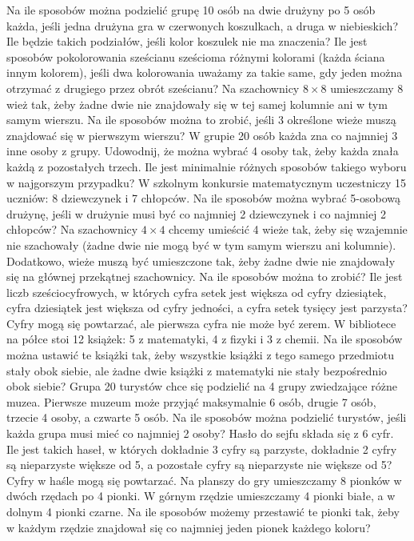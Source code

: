 Na ile sposobów można podzielić grupę 10 osób na dwie drużyny po 5 osób każda, jeśli jedna drużyna gra w czerwonych koszulkach, a druga w niebieskich? Ile będzie takich podziałów, jeśli kolor koszulek nie ma znaczenia?
Ile jest sposobów pokolorowania sześcianu sześcioma różnymi kolorami (każda ściana innym kolorem), jeśli dwa kolorowania uważamy za takie same, gdy jeden można otrzymać z drugiego przez obrót sześcianu?
Na szachownicy $8 \times 8$ umieszczamy 8 wież tak, żeby żadne dwie nie znajdowały się w tej samej kolumnie ani w tym samym wierszu. Na ile sposobów można to zrobić, jeśli 3 określone wieże muszą znajdować się w pierwszym wierszu?
W grupie 20 osób każda zna co najmniej 3 inne osoby z grupy. Udowodnij, że można wybrać 4 osoby tak, żeby każda znała każdą z pozostałych trzech. Ile jest minimalnie różnych sposobów takiego wyboru w najgorszym przypadku?
W szkolnym konkursie matematycznym uczestniczy 15 uczniów: 8 dziewczynek i 7 chłopców. Na ile sposobów można wybrać 5-osobową drużynę, jeśli w drużynie musi być co najmniej 2 dziewczynek i co najmniej 2 chłopców?
Na szachownicy $4 \times 4$ chcemy umieścić 4 wieże tak, żeby się wzajemnie nie szachowały (żadne dwie nie mogą być w tym samym wierszu ani kolumnie). Dodatkowo, wieże muszą być umieszczone tak, żeby żadne dwie nie znajdowały się na głównej przekątnej szachownicy. Na ile sposobów można to zrobić?
Ile jest liczb sześciocyfrowych, w których cyfra setek jest większa od cyfry dziesiątek, cyfra dziesiątek jest większa od cyfry jedności, a cyfra setek tysięcy jest parzysta? Cyfry mogą się powtarzać, ale pierwsza cyfra nie może być zerem.
W bibliotece na półce stoi 12 książek: 5 z matematyki, 4 z fizyki i 3 z chemii. Na ile sposobów można ustawić te książki tak, żeby wszystkie książki z tego samego przedmiotu stały obok siebie, ale żadne dwie książki z matematyki nie stały bezpośrednio obok siebie?
Grupa 20 turystów chce się podzielić na 4 grupy zwiedzające różne muzea. Pierwsze muzeum może przyjąć maksymalnie 6 osób, drugie 7 osób, trzecie 4 osoby, a czwarte 5 osób. Na ile sposobów można podzielić turystów, jeśli każda grupa musi mieć co najmniej 2 osoby?
Hasło do sejfu składa się z 6 cyfr. Ile jest takich haseł, w których dokładnie 3 cyfry są parzyste, dokładnie 2 cyfry są nieparzyste większe od 5, a pozostałe cyfry są nieparzyste nie większe od 5? Cyfry w haśle mogą się powtarzać.
Na planszy do gry umieszczamy 8 pionków w dwóch rzędach po 4 pionki. W górnym rzędzie umieszczamy 4 pionki białe, a w dolnym 4 pionki czarne. Na ile sposobów możemy przestawić te pionki tak, żeby w każdym rzędzie znajdował się co najmniej jeden pionek każdego koloru?
